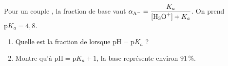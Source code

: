 \documentclass[11pt,a4paper]{article}
\begin{document}
\begin{exo}
Pour un couple , la fraction de base vaut $\alpha_{\ce{A-}} = \dfrac{K_a}{[\ce{H3O+}] + K_a}$. On
prend $\mathrm{p}K_a = 4{,}8$.
\begin{enumerate}[label=\alph*)]
  \item Quelle est la fraction de  lorsque $\mathrm{pH} = \mathrm{p}K_a$ ?
  \item Montre qu'à $\mathrm{pH} = \mathrm{p}K_a + 1$, la base représente environ $91\,\%$.
\end{enumerate}
\end{exo}
\end{document}
